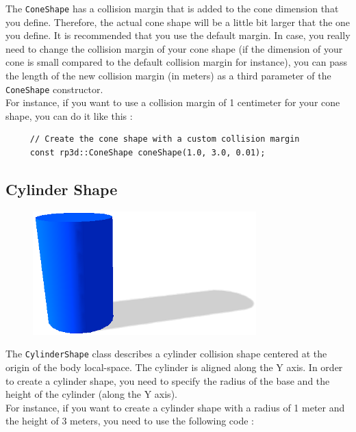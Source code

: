 \documentclass[a4paper,12pt]{article}
\begin{document}
    The \texttt{ConeShape} has a collision margin that is added to the cone dimension that you define. Therefore, the actual cone shape will be a little bit larger that the one you define.
    It is recommended that you use the default margin. In case, you really need to change the collision margin of your cone shape (if the dimension of your cone is small compared
    to the default collision margin for instance), you can pass the length of the new collision margin (in meters) as a third parameter of the \texttt{ConeShape} constructor. \\

    For instance, if you want to use a collision margin of 1 centimeter for your cone shape, you can do it like this : \\

   \begin{lstlisting}
     // Create the cone shape with a custom collision margin
     const rp3d::ConeShape coneShape(1.0, 3.0, 0.01);
  \end{lstlisting}

    \subsection{Cylinder Shape}

    \begin{figure}[h]
        \centering
        \includegraphics{cylindershape.png}
        \label{fig:cylindershape}
    \end{figure}

    The \texttt{CylinderShape} class describes a cylinder collision shape centered at the origin of the body local-space. The cylinder is aligned along the Y axis.
    In order to create a cylinder shape, you need to specify the radius of the base and the height of the cylinder (along the Y axis). \\

    For instance, if you want to create a cylinder shape with a radius of 1 meter and the height of 3 meters, you need to use the following code : \\
\end{document}
